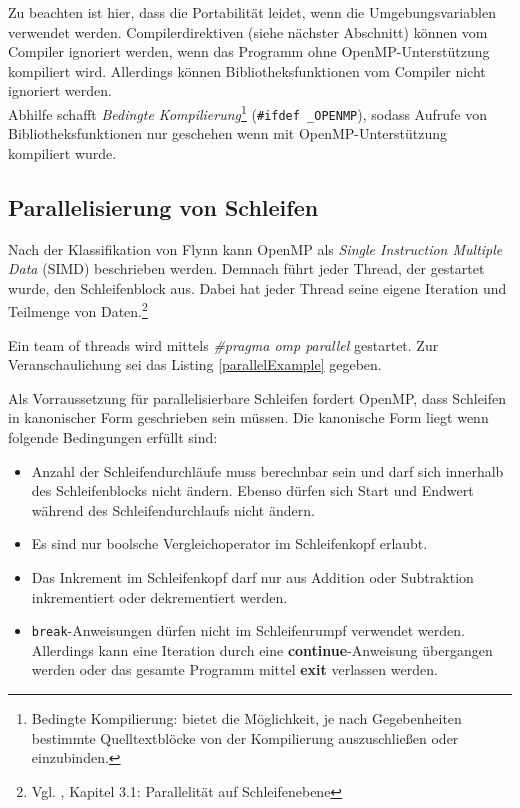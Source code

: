 \documentclass[11pt]{scrartcl}
\begin{document}
Zu beachten ist hier, dass die Portabilität leidet, wenn die Umgebungsvariablen verwendet werden. Compilerdirektiven (siehe nächster Abschnitt) können vom Compiler ignoriert werden, wenn das Programm ohne OpenMP-Unterstützung kompiliert wird. Allerdings können Bibliotheksfunktionen vom Compiler nicht ignoriert werden. \\
Abhilfe schafft \textit{Bedingte Kompilierung}\footnote{Bedingte Kompilierung: bietet die Möglichkeit, je nach Gegebenheiten bestimmte Quelltextblöcke von der Kompilierung auszuschließen oder einzubinden. } (\texttt{\#ifdef \_OPENMP}), sodass Aufrufe von Bibliotheksfunktionen nur geschehen wenn mit OpenMP-Unterstützung kompiliert wurde. 

\subsection{Parallelisierung von Schleifen} 
Nach der Klassifikation von Flynn kann OpenMP als \emph{Single Instruction Multiple Data} (SIMD) beschrieben werden. Demnach führt jeder Thread, der gestartet wurde, den Schleifenblock aus. Dabei hat jeder Thread seine eigene Iteration und Teilmenge von Daten.\footnote{Vgl. \cite{openmp08}, Kapitel 3.1: Parallelität auf Schleifenebene}

Ein team of threads wird mittels \textit{\#pragma omp parallel} gestartet. Zur Veranschaulichung sei das Listing \ref{parallelExample} gegeben. 

Als Vorraussetzung für parallelisierbare Schleifen fordert OpenMP, dass Schleifen in kanonischer Form geschrieben sein müssen. Die kanonische Form liegt wenn folgende Bedingungen erfüllt sind: 
\begin{itemize}
\item Anzahl der Schleifendurchläufe muss berechnbar sein und darf sich innerhalb des Schleifenblocks nicht ändern. Ebenso dürfen sich Start und Endwert während des Schleifendurchlaufs nicht ändern.
\item Es sind nur boolsche Vergleichoperator im Schleifenkopf erlaubt.
\item Das Inkrement im Schleifenkopf darf nur aus Addition oder Subtraktion inkrementiert oder dekrementiert werden. 
\item \texttt{break}-Anweisungen dürfen nicht im Schleifenrumpf verwendet werden. Allerdings kann eine Iteration durch eine \textbf{continue}-Anweisung übergangen werden oder das gesamte Programm mittel \textbf{exit} verlassen werden.
\end{itemize}
\end{document}

